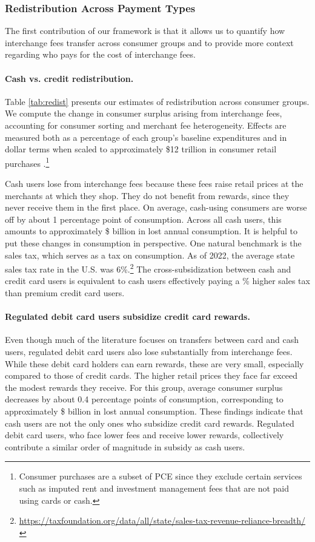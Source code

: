 \documentclass[main.tex]{subfiles}
\begin{document}
\subsubsection{Redistribution Across Payment Types}

The first contribution of our framework is that it allows us to quantify how interchange fees transfer across consumer groups and to provide more context regarding who pays for the cost of interchange fees.

\paragraph{Cash vs. credit redistribution.}
Table \ref{tab:redist} presents our estimates of redistribution across consumer groups.
We compute the change in consumer surplus arising from interchange fees, accounting for consumer sorting and merchant fee heterogeneity.
Effects are measured both as a percentage of each group's baseline expenditures and in dollar terms when scaled to approximately \$12 trillion in consumer retail purchases \citep{Nilson2023a}.\footnote{Consumer purchases are a subset of PCE since they exclude certain services such as imputed rent and investment management fees that are not paid using cards or cash.}

Cash users lose from interchange fees because these fees raise retail prices at the merchants at which they shop.
They do not benefit from rewards, since they never receive them in the first place.
On average, cash-using consumers are worse off by about 1 percentage point of consumption.
Across all cash users, this amounts to approximately \$ billion in lost annual consumption.
It is helpful to put these changes in consumption in perspective.
One natural benchmark is the sales tax, which serves as a tax on consumption.
As of 2022, the average state sales tax rate in the U.S. was 6\%.\footnote{\url{https://taxfoundation.org/data/all/state/sales-tax-revenue-reliance-breadth/}} The cross-subsidization between cash and credit card users is equivalent to cash users effectively paying a \% higher sales tax than premium credit card users.

\paragraph{Regulated debit card users subsidize credit card rewards.}
Even though much of the literature focuses on transfers between card and cash users, regulated debit card users also lose substantially from interchange fees.
While these debit card holders can earn rewards, these are very small, especially compared to those of credit cards.
The higher retail prices they face far exceed the modest rewards they receive. For this group, average consumer surplus decreases by about 0.4 percentage points of consumption, corresponding to approximately \$ billion in lost annual consumption.
These findings indicate that cash users are not the only ones who subsidize credit card rewards.
Regulated debit card users, who face lower fees and receive lower rewards, collectively contribute a similar order of magnitude in subsidy as cash users.
\end{document}
